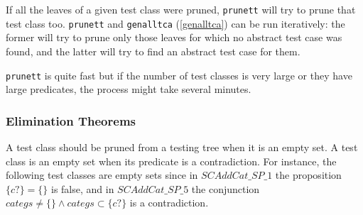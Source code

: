 If all the leaves of a given test class were pruned, \verb+prunett+ will try to prune that test class too. \verb+prunett+ and \verb+genalltca+ (\ref{genalltca}) can be run iteratively: the former will try to prune only those leaves for which no abstract test case was found, and the latter will try to find an abstract test case for them.

\verb+prunett+ is quite fast but if the number of test classes is very large or they have large predicates, the process might take several minutes.


\subsubsection{\label{elimtheor}Elimination Theorems}

A test class should be pruned from a testing tree when it is an empty set. A test class is an empty set when its predicate is a contradiction. For instance, the following test classes are empty sets since in $SCAddCat\_ SP\_ 1$ the proposition $\{ c? \} = \{ \}$ is false, and in $SCAddCat\_ SP\_ 5$ the conjunction $categs \neq \{ \} \land categs \subset \{ c? \}$ is a contradiction.

\begin{multicols}{2}

\end{multicols}

